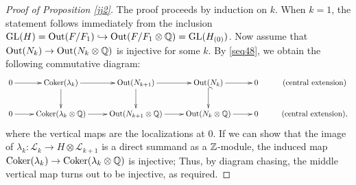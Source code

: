 \documentclass{article}
\theoremstyle{plain}
\theoremstyle{definition}
\def\Coker{\mathop{\mathrm{Coker}}\nolimits}
\newcommand{\lra}{\longrightarrow}
\newcommand{\ra}{\rightarrow}
\newcommand{\Q}{{\Bbb Q}}
\newcommand{\Z}{{\Bbb Z}}
\newcommand{\Out}{{\rm Out}}
\newcommand{\GL}{{\rm GL}}
\begin{document}
{\begin{proof}
[Proof of Proposition \ref{jj2}] The proof proceeds by induction on $k$.
When $k = 1$, the statement follows immediately from the inclusion $\GL(H)= \Out(F/F_1) \hookrightarrow \Out(F/F_1 \otimes \Q )= \GL(H_{(0)}) $. 
Now assume that $\Out(N_k) \to \Out(N_k \otimes \Q)$ is injective for some $k $.
By \eqref{seq48}, we obtain the following commutative diagram:
\[{\normalsize
\xymatrix{ 
0 \ar[r] & \Coker ( \lambda_k ) \ar[r] \ar[d]
& \Out(N_{k+1}) \ar[r] \ar[d]& \Out(N_{k}) \ar[r] \ar@{^{(}->}[d] & 0 & (\mathrm{central \ extension})\\
0 \ar[r] & \Coker ( \lambda_k \otimes \Q ) \ar[r]
& \Out(N_{k+1}\otimes \Q) \ar[r]& \Out(N_{k}\otimes \Q) \ar[r]& 0 & (\mathrm{central \ extension}),
}}
\]
where the vertical maps are the localizations at 0. 
If we can show that the image of $\lambda_k : \mathcal{L}_{k} \lra H \otimes \mathcal{L}_{k+1}$ is a direct summand as a $\Z$-module,
the induced map $\Coker ( \lambda_k ) \ra \Coker ( \lambda_k \otimes \Q) $ is injective; 
Thus, by diagram chasing, the middle vertical map turns out to be injective, as required.


\end{proof}}
\end{document}
